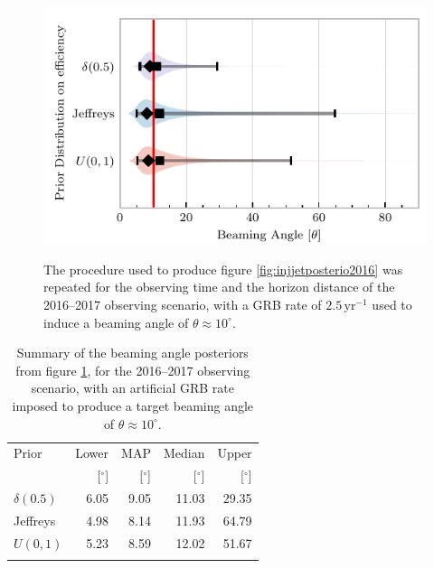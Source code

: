 \documentclass[twocolumn]{aastex61}
\newcommand{\yr}{\mathrm{yr}}
\begin{document}
\begin{figure}%
\centering
{\includegraphics[width=\linewidth]{O2_injections_violin.pdf}}
\caption{The procedure used to produce figure \ref{fig:injjetposterio2016} was repeated for the observing time and the horizon distance of the 2016--2017 observing scenario, with a GRB rate of $2.5 \,\yr^{-1}$ used to induce a beaming angle of $\theta \approx 10^{\circ}$.
  \label{fig:injjetposterio2022}}
\end{figure}
\begin{table}
  \centering
  \begin{tabular}{lrrrr}
    \toprule
    Prior & Lower & MAP & Median & Upper\\
          & [$^\circ$] & [$^\circ$]& [$^\circ$]& [$^\circ$] \\
    \colrule
    
    $\delta(0.5)$ & 6.05	 & 9.05	 & 11.03	 & 29.35	 \\
    Jeffreys & 4.98	 & 8.14	 & 11.93	 & 64.79	 \\
    $U(0,1)$ & 5.23	 & 8.59	 & 12.02	 & 51.67	 \\
\botrule
\end{tabular}
\caption{Summary of the beaming angle posteriors from figure
  \ref{fig:injjetposterio2022}, for the 2016--2017 observing scenario,
  with an artificial GRB rate imposed to produce a target beaming
  angle of $\theta \approx 10^{\circ}$.}
  \label{tab:summaryinj2016}
\end{table}
\end{document}
